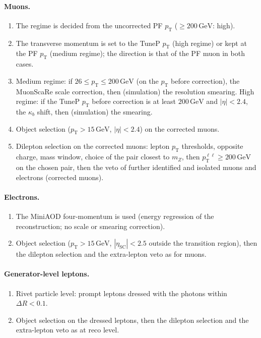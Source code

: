 \documentclass[11pt]{article}
\newcommand{\pt}{p_{\mathrm{T}}}
\newcommand{\GeV}{\ensuremath{\,\mathrm{GeV}}}
\newcommand{\ptll}{\pt^{\ell\ell}}
\begin{document}
\paragraph{Muons.}
\begin{enumerate}[label=M\arabic*.]
\item The regime is decided from the uncorrected PF $\pt$ ($\geq 200\GeV$: high).
\item The transverse momentum is set to the TuneP $\pt$ (high regime) or kept at the PF $\pt$ (medium regime); the
  direction is that of the PF muon in both cases.
\item Medium regime: if $26 \leq \pt \leq 200\GeV$ (on the $\pt$ before correction), the MuonScaRe scale correction,
  then (simulation) the resolution smearing. High regime: if the TuneP $\pt$ before correction is at least $200\GeV$
  and $|\eta| < 2.4$, the $\kappa_b$ shift, then (simulation) the smearing.
\item Object selection ($\pt > 15\GeV$, $|\eta| < 2.4$) on the corrected muons.
\item Dilepton selection on the corrected muons: lepton $\pt$ thresholds, opposite charge, mass window, choice of the
  pair closest to $m_Z$, then $\ptll \geq 200\GeV$ on the chosen pair, then the veto of further identified and isolated
  muons and electrons (corrected muons).
\end{enumerate}

\paragraph{Electrons.}
\begin{enumerate}[label=E\arabic*.]
\item The MiniAOD four-momentum is used (energy regression of the reconstruction; no scale or smearing correction).
\item Object selection ($\pt > 15\GeV$, $|\eta_\mathrm{SC}| < 2.5$ outside the transition region), then the dilepton
  selection and the extra-lepton veto as for muons.
\end{enumerate}

\paragraph{Generator-level leptons.}
\begin{enumerate}[label=G\arabic*.]
\item Rivet particle level: prompt leptons dressed with the photons within $\Delta R < 0.1$.
\item Object selection on the dressed leptons, then the dilepton selection and the extra-lepton veto as at reco level.
\end{enumerate}
\end{document}
